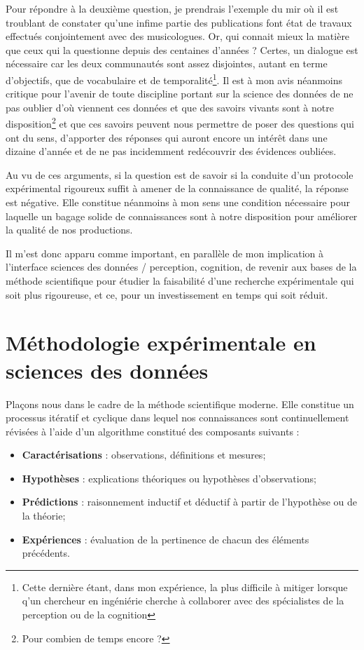 Pour répondre à la deuxième question, je prendrais l'exemple du mir où il est troublant de constater qu'une infime partie des publications font état de travaux effectués conjointement avec des musicologues. Or, qui connait mieux la matière que ceux qui la questionne depuis des centaines d'années ? Certes, un dialogue est nécessaire car les deux communautés sont assez disjointes, autant en terme d'objectifs, que de vocabulaire et de temporalité\footnote{Cette dernière étant, dans mon expérience, la plus difficile à mitiger lorsque q'un chercheur en ingéniérie cherche à collaborer avec des spécialistes de la perception ou de la cognition}. Il est à mon avis néanmoins critique pour l'avenir de toute discipline portant sur la science des données de ne pas oublier d'où viennent ces données et que des savoirs vivants sont à notre disposition\footnote{Pour combien de temps encore ?} et que ces savoirs peuvent nous permettre de poser des questions qui ont du sens, d'apporter des réponses qui auront encore un intérêt dans une dizaine d'année et de ne pas incidemment redécouvrir des évidences oubliées.

Au vu de ces arguments, si la question est de savoir si la conduite d'un protocole expérimental rigoureux suffit à amener de la connaissance de qualité, la réponse est négative. Elle constitue néanmoins à mon sens une condition nécessaire pour laquelle un bagage solide de connaissances sont à notre disposition pour améliorer la qualité de nos productions.

Il m'est donc apparu comme important, en parallèle de mon implication à l'interface sciences des données / perception, cognition, de revenir aux bases de la méthode scientifique pour étudier la faisabilité d'une recherche expérimentale qui soit plus rigoureuse, et ce, pour un investissement en temps qui soit réduit.

\section{ \nmu Méthodologie expérimentale en sciences des données} \label{sec:xp}

Plaçons nous dans le cadre de la méthode scientifique moderne. Elle constitue un processus itératif et cyclique dans lequel nos connaissances sont continuellement révisées à l'aide d'un algorithme constitué des composants suivants :
\begin{itemize}
  \item \textbf{Caractérisations} : observations, définitions et mesures;
  \item \textbf{Hypothèses} : explications théoriques ou hypothèses d'observations;
  \item \textbf{Prédictions} : raisonnement inductif et déductif à partir de l'hypothèse ou de la théorie;
  \item \textbf{Expériences} : évaluation de la pertinence de chacun des éléments précédents.
\end{itemize}

